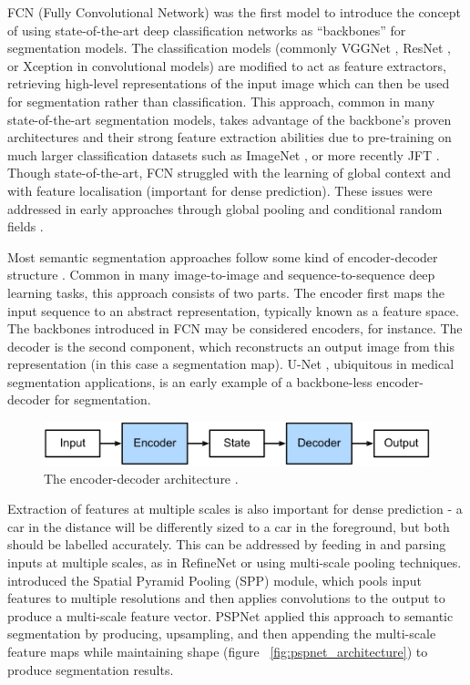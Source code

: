 \documentclass[a4paper,12pt]{report}
\begin{document}
    FCN (Fully Convolutional Network) \cite{long_fully_2015} was the first model to introduce the concept of using state-of-the-art deep classification networks as “backbones” for segmentation models. The classification models (commonly VGGNet \cite{simonyan_very_2015}, ResNet \cite{he_deep_2015}, or Xception \cite{chollet_xception_2017} in convolutional models) are modified to act as feature extractors, retrieving high-level representations of the input image which can then be used for segmentation rather than classification. This approach, common in many state-of-the-art segmentation models, takes advantage of the backbone's proven architectures and their strong feature extraction abilities due to pre-training on much larger classification datasets such as ImageNet \cite{russakovsky_imagenet_2015}, or more recently JFT \cite{sun_revisiting_2017}. Though state-of-the-art, FCN struggled with the learning of global context and with feature localisation (important for dense prediction). These issues were addressed in early approaches through global pooling \cite{liu_parsenet_2015} and conditional random fields \cite{chen_semantic_2016}.
    
    Most semantic segmentation approaches follow some kind of encoder-decoder structure \cite{zhang_dive_2019}. Common in many image-to-image and sequence-to-sequence deep learning tasks, this approach consists of two parts. The encoder first maps the input sequence to an abstract representation, typically known as a feature space. The backbones introduced in FCN may be considered encoders, for instance. The decoder is the second component, which reconstructs an output image from this representation (in this case a segmentation map). U-Net \cite{ronneberger_u-net_2015}, ubiquitous in medical segmentation applications, is an early example of a backbone-less encoder-decoder for segmentation.
    
    \begin{figure}[ht]
        \centering
        \includegraphics[width=\textwidth]{res/encoder-decoder.png}
        \caption{The encoder-decoder architecture \cite{zhang_dive_2019}.}
        \label{fig:encoder_decoder}
    \end{figure}
    
    Extraction of features at multiple scales is also important for dense prediction - a car in the distance will be differently sized to a car in the foreground, but both should be labelled accurately. This can be addressed by feeding in and parsing inputs at multiple scales, as in RefineNet \cite{lin_refinenet_2016} or using multi-scale pooling techniques. \cite{he_spatial_2014} introduced the Spatial Pyramid Pooling (SPP) module, which pools input features to multiple resolutions and then applies convolutions to the output to produce a multi-scale feature vector. PSPNet \cite{zhao_pyramid_2017} applied this approach to semantic segmentation by producing, upsampling, and then appending the multi-scale feature maps while maintaining shape (figure ~\ref{fig:pspnet_architecture}) to produce segmentation results.
    
\end{document}
